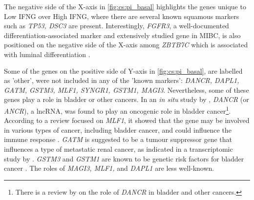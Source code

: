 The negative side of the X-axis in \cref{fig:cs:pi_basal} highlights the genes unique to Low IFNG over High IFNG, where there are several known squamous markers such as \textit{TP53, DSC3} are present. Interestingly, \textit{FGFR3}, a well-documented differentiation-associated marker and extensively studied gene in MIBC, is also positioned on the negative side of the X-axis among \textit{ZBTB7C} which is associated with luminal differentiation \citep{Ramal2024-ha}.

Some of the genes on the positive side of Y-axis in \cref{fig:cs:pi_basal}, 
are labelled as 'other', were not included in any of the 'known markers': \textit{DANCR, DAPL1, GATM, GSTM3, MLF1, SYNGR1, GSTM1, MAGI3}. Nevertheless, some of these genes play a role in bladder or other cancers. In an \textit{in situ} study by \citet{Zhan2018-um}, \textit{DANCR} (or \textit{ANCR}), a \acrfull{lncRNA}, was found to play an oncogenic role in bladder cancer\footnote{There is a review by \citet{Wang2021-gn} on the role of \textit{DANCR} in bladder and other cancers.}. According to a review focused on \textit{MLF1}, it showed that the gene may be involved in various types of cancer, including bladder cancer, and could influence the immune response \citep{Li2023-mk}. \textit{GATM} is suggested to be a tumour suppressor gene that influences a type of metastatic renal cancer, as indicated in a transcriptomic study by \citet{Jee2022-wi}. \textit{GSTM3} and \textit{GSTM1} are known to be genetic risk factors for bladder cancer \citep{Schnakenberg2000-cu}. The roles of \textit{MAGI3, MLF1,} and \textit{DAPL1} are less well-known.

